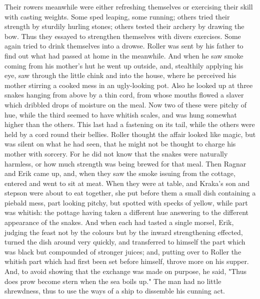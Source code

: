 \documentclass[10pt,a4paper]{report}
\begin{document}
Their rowers meanwhile were either refreshing themselves or exercising their skill with casting weights. Some sped leaping, some running; others tried their strength by sturdily hurling stones; others tested their archery by drawing the bow. Thus they essayed to strengthen themselves with divers exercises. Some again tried to drink themselves into a drowse. Roller was sent by his father to find out what had passed at home in the meanwhile. And when he saw smoke coming from his mother's hut he went up outside, and, stealthily applying his eye, saw through the little chink and into the house, where he perceived his mother stirring a cooked mess in an ugly-looking pot. Also he looked up at three snakes hanging from above by a thin cord, from whose mouths flowed a slaver which dribbled drops of moisture on the meal. Now two of these were pitchy of hue, while the third seemed to have whitish scales, and was hung somewhat higher than the others. This last had a fastening on its tail, while the others were held by a cord round their bellies. Roller thought the affair looked like magic, but was silent on what he had seen, that he might not be thought to charge his mother with sorcery. For he did not know that the snakes were naturally harmless, or how much strength was being brewed for that meal. Then Ragnar and Erik came up, and, when they saw the smoke issuing from the cottage, entered and went to sit at meat. When they were at table, and Kraka's son and stepson were about to eat together, she put before them a small dish containing a piebald mess, part looking pitchy, but spotted with specks of yellow, while part was whitish: the pottage having taken a different hue answering to the different appearance of the snakes. And when each had tasted a single morsel, Erik, judging the feast not by the colours but by the inward strengthening effected, turned the dish around very quickly, and transferred to himself the part which was black but compounded of stronger juices; and, putting over to Roller the whitish part which had first been set before himself, throve more on his supper. And, to avoid showing that the exchange was made on purpose, he said, "Thus does prow become stern when the sea boils up." The man had no little shrewdness, thus to use the ways of a ship to dissemble his cunning act.\\
\end{document}

